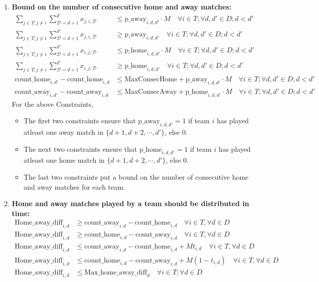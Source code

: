 \documentclass[a4paper, 12pt]{article}
\begin{document}
\begin{enumerate}
    \item \textbf{Bound on the number of consecutive home and away matches:}
    \begin{align*}
        \sum_{j \in T;j \neq i} \sum_{\mathcal{D} = d+1}^{d'} x_{j,i,\mathcal{D}} &\leq \text{p\_away}_{i,d,d'} \cdot M \quad \forall i \in T ; \forall d,d' \in D; d < d'\\
        \sum_{j \in T;j \neq i} \sum_{\mathcal{D} = d+1}^{d'} x_{j,i,\mathcal{D}} &\geq \text{p\_away}_{i,d,d'} \quad \forall i \in T ; \forall d,d' \in D; d < d'\\
        \sum_{j \in T;j \neq i} \sum_{\mathcal{D} = d+1}^{d'} x_{i,j,\mathcal{D}} &\leq \text{p\_home}_{i,d,d'} \cdot M \quad \forall i \in T ; \forall d,d' \in D; d < d'\\
        \sum_{j \in T;j \neq i} \sum_{\mathcal{D} = d+1}^{d'} x_{i,j,\mathcal{D}} &\geq \text{p\_home}_{i,d,d'} \quad \forall i \in T ; \forall d,d' \in D; d < d' \\
        \text{count\_home}_{i,d'} - \text{count\_home}_{i,d} &\leq \text{MaxConsecHome} + \text{p\_away}_{i,d,d'} \cdot M \quad \forall i \in T ; \forall d,d' \in D; d < d' \\
        \text{count\_away}_{i,d'} - \text{count\_away}_{i,d} &\leq \text{MaxConsecAway} + \text{p\_home}_{i,d,d'} \cdot M \quad \forall i \in T ; \forall d,d' \in D; d < d'
    \end{align*}
    For the above Constraints,
    \begin{itemize}
        \item The first two constraints ensure that $\text{p\_away}_{i,d,d'}=1$ if team $i$ has played atleast one away match in $\{d+1,d+2,\cdots, d'\}$, else 0.
        \item The next two constraints ensure that $\text{p\_home}_{i,d,d'}=1$ if team $i$ has played atleast one home match in $\{d+1,d+2,\cdots, d'\}$, else 0.
        \item The last two constraints put a bound on the number of consecutive home and away matches for each team.
    \end{itemize}


    \item \textbf{Home and away matches played by a team should be distributed in time:}
    \begin{align*}
        \text{Home\_away\_diff}_{i,d} &\geq \text{count\_away}_{i,d} - \text{count\_home}_{i,d} \quad \forall i \in T, \forall d \in D\\
        \text{Home\_away\_diff}_{i,d} &\geq \text{count\_home}_{i,d} - \text{count\_away}_{i,d} \quad \forall i \in T, \forall d \in D \\
        \text{Home\_away\_diff}_{i,d} &\leq \text{count\_away}_{i,d} - \text{count\_home}_{i,d} + M t_{i,d} \quad \forall i \in T, \forall d \in D\\
        \text{Home\_away\_diff}_{i,d} &\leq \text{count\_home}_{i,d} - \text{count\_away}_{i,d} + M (1 - t_{i,d}) \quad \forall i \in T, \forall d \in D\\
        \text{Home\_away\_diff}_{i,d} &\leq \text{Max\_home\_away\_diff}_{d} \quad \forall i \in T; \forall d \in D
    \end{align*}


\end{enumerate}
\end{document}

